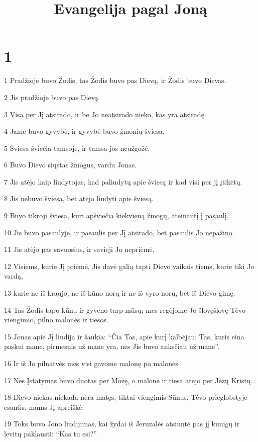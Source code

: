 

\title{Evangelija pagal Joną}

\chapter{1}


\par 1 Pradžioje buvo Žodis, tas Žodis buvo pas Dievą, ir Žodis buvo Dievas. 
\par 2 Jis pradžioje buvo pas Dievą. 
\par 3 Visa per Jį atsirado, ir be Jo neatsirado nieko, kas yra atsiradę. 
\par 4 Jame buvo gyvybė, ir gyvybė buvo žmonių šviesa. 
\par 5 Šviesa šviečia tamsoje, ir tamsa jos neužgožė. 
\par 6 Buvo Dievo siųstas žmogus, vardu Jonas. 
\par 7 Jis atėjo kaip liudytojas, kad paliudytų apie šviesą ir kad visi per jį įtikėtų. 
\par 8 Jis nebuvo šviesa, bet atėjo liudyti apie šviesą. 
\par 9 Buvo tikroji šviesa, kuri apšviečia kiekvieną žmogų, ateinantį į pasaulį. 
\par 10 Jis buvo pasaulyje, ir pasaulis per Jį atsirado, bet pasaulis Jo nepažino. 
\par 11 Jis atėjo pas savuosius, ir savieji Jo nepriėmė. 
\par 12 Visiems, kurie Jį priėmė, Jis davė galią tapti Dievo vaikais­ tiems, kurie tiki Jo vardą, 
\par 13 kurie ne iš kraujo, ne iš kūno norų ir ne iš vyro norų, bet iš Dievo gimę. 
\par 14 Tas Žodis tapo kūnu ir gyveno tarp mūsų; mes regėjome Jo šlovę­šlovę Tėvo viengimio, pilno malonės ir tiesos. 
\par 15 Jonas apie Jį liudija ir šaukia: “Čia Tas, apie kurį kalbėjau: Tas, kuris eina paskui mane, pirmesnis už mane yra, nes Jis buvo anksčiau už mane”. 
\par 16 Ir iš Jo pilnatvės mes visi gavome malonę po malonės. 
\par 17 Nes Įstatymas buvo duotas per Mozę, o malonė ir tiesa atėjo per Jėzų Kristų. 
\par 18 Dievo niekas niekada nėra matęs, tiktai viengimis Sūnus, Tėvo prieglobstyje esantis, mums Jį apreiškė. 
\par 19 Toks buvo Jono liudijimas, kai žydai iš Jeruzalės atsiuntė pas jį kunigų ir levitų paklausti: “Kas tu esi?” 
